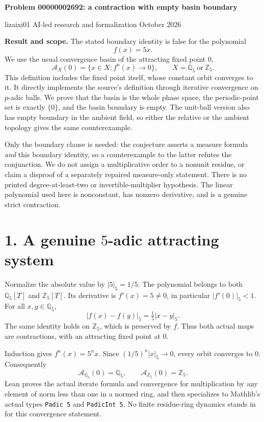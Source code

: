 \documentclass[10pt]{article}
\newcommand{\Qp}{\mathbb{Q}_5}\newcommand{\Zp}{\mathbb{Z}_5}
\begin{document}
\begin{center}
{\Large\bfseries Problem 00000002692: a contraction with empty basin boundary}

lizaixi01 \quad AI-led research and formalization  October 2026
\end{center}
\textbf{Result and scope.} The stated boundary identity is false for the polynomial
\[
f(x)=5x.
\]
We use the usual convergence basin of the attracting fixed point $0$,
\[
\mathcal A_X(0)=\{x\in X:f^n(x)\longrightarrow0\},
\qquad X=\Qp\ \text{or}\ \Zp.
\]
This definition includes the fixed point itself, whose constant orbit converges to it. It directly implements the source's definition through iterative convergence on $p$-adic balls. We prove that the basin is the whole phase space, the periodic-point set is exactly $\{0\}$, and the basin boundary is empty. The unit-ball version also has empty boundary in the ambient field, so either the relative or the ambient topology gives the same counterexample.

Only the boundary clause is needed: the conjecture asserts a measure formula \emph{and} this boundary identity, so a counterexample to the latter refutes the conjunction. We do not assign a multiplicative order to a nonunit residue, or claim a disproof of a separately repaired measure-only statement. There is no printed degree-at-least-two or invertible-multiplier hypothesis. The linear polynomial used here is nonconstant, has nonzero derivative, and is a genuine strict contraction.

\section*{1. A genuine $5$-adic attracting system}
Normalize the absolute value by $|5|_5=1/5$. The polynomial belongs to both $\Qp[T]$ and $\Zp[T]$. Its derivative is $f'(x)=5\ne0$, in particular $|f'(0)|_5<1$. For all $x,y\in\Qp$,
\[
|f(x)-f(y)|_5=\tfrac15|x-y|_5.
\]
The same identity holds on $\Zp$, which is preserved by $f$. Thus both actual maps are contractions, with an attracting fixed point at $0$.

Induction gives $f^n(x)=5^n x$. Since $(1/5)^n|x|_5\to0$, every orbit converges to $0$. Consequently
\[
\mathcal A_{\Qp}(0)=\Qp,\qquad
\mathcal A_{\Zp}(0)=\Zp.
\]
Lean proves the actual iterate formula and convergence for multiplication by any element of norm less than one in a normed ring, and then specializes to Mathlib's actual types \texttt{Padic 5} and \texttt{PadicInt 5}. No finite residue-ring dynamics stands in for this convergence statement.
\end{document}
